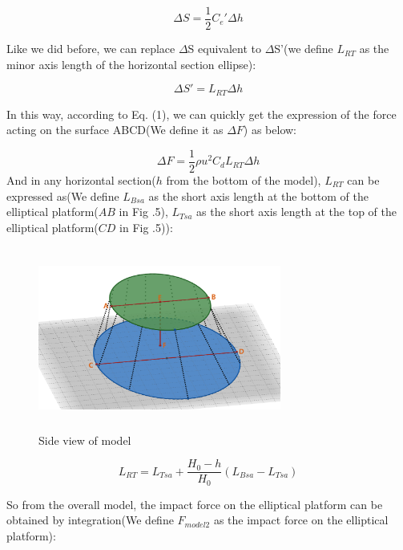 \documentclass[13pt]{ctexart}
\begin{document}
	\begin{equation}
	{\Delta}S = \frac{1}{2}  {C_e}'  {\Delta}h
	\label{eq_pagerank}
	\end{equation}
	
	Like we did before, we can replace $\Delta$S equivalent to $\Delta$S'(we define $L_{RT}$ as the minor axis length of the horizontal section ellipse):
	
	\begin{equation}
	{\Delta}S' = L_{RT}  {\Delta}h
	\label{eq_pagerank}
	\end{equation}
	
	In this way, according to Eq. (1), we can quickly get the expression of the force acting on the surface ABCD(We define it as ${\Delta}F$) as below:
	
	\begin{equation}
	{\Delta}F = \frac{1}{2}  {\rho}  {u^{2}} C_{d}  L_{RT}  {\Delta}h
	\label{eq_pagerank}
	\end{equation}
	And in any horizontal section($h$ from the bottom of the model), $L_{RT}$ can be expressed as(We define $L_{Bsa}$ as the short axis length at the bottom of the elliptical platform($AB$ in Fig .5), $L_{Tsa}$ as the short axis length at the top of the elliptical platform($CD$ in Fig .5)):
	
	\begin {figure}[htb]
	\centering %
	\includegraphics[width=8cm,height=6cm]{Side_v.png}
	\caption{Side view of model} %
	\label{spread_rate}
	\end {figure}
	
	\begin{equation}
	L_{RT} = L_{Tsa} + \frac{H_0 - h}{H_0}  (L_{Bsa} - L_{Tsa})
	\label{eq_pagerank}
	\end{equation}
	
	So from the overall model, the impact force on the elliptical platform can be obtained by integration(We define $F_{model2}$ as the impact force on the elliptical platform):
	
\end{document}
